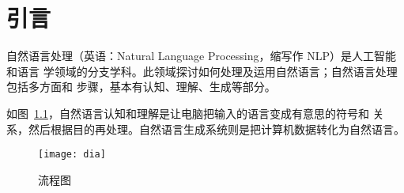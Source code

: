 \documentclass[../main]{subfiles}
\begin{document}
\chapter{引言}%
\label{cha:introduction}

自然语言处理（英语：Natural Language Processing，缩写作 NLP）是人工智能和语言
学领域的分支学科。此领域探讨如何处理及运用自然语言；自然语言处理包括多方面和
步骤，基本有认知、理解、生成等部分\cite{larson2010introduction}。

如图~\ref{fig:dia}，自然语言认知和理解是让电脑把输入的语言变成有意思的符号和
关系，然后根据目的再处理。自然语言生成系统则是把计算机数据转化为自然语言。

\begin{figure}[htbp]
  \centering
  \texttt{[image: dia]}
  \caption{流程图}%
  \label{fig:dia}
\end{figure}
\end{document}
